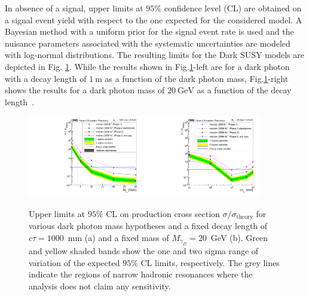 In absence of a signal, upper limits at $95\%$ confidence level (CL) are obtained on a signal
event yield with respect to the one expected for the considered model. A Bayesian method with a uniform prior for the signal event rate is used and the nuisance
parameters associated with the systematic uncertainties are modeled with log-normal distributions.
The resulting limits for the Dark SUSY models are depicted in Fig. \ref{fig:NewCompLimit_DarkPhoton}. While the results shown in Fig.\ref{fig:NewCompLimit_DarkPhoton}-left are for a dark photon with a decay length of $1~\mathrm{m}$ as a function of the dark photon mass, Fig.\ref{fig:NewCompLimit_DarkPhoton}-right shows the results for a dark photon mass of $20~\mathrm{GeV}$ as a function of the decay length~\cite{CMS-PAS-FTR-18-002}.



\begin{figure}[hbtp]
\begin{center}
\includegraphics[width=0.45\textwidth]{tex/figures/cmsupgrade/FTR-18-002/LimitComp_Ratio_DarkPhotons.pdf}
\includegraphics[width=0.45\textwidth]{tex/figures/cmsupgrade/FTR-18-002/LimitComp_Ratio_asfuncofCtau_DarkPhotons.pdf}
 \caption{Upper limits at $95\%$ CL on production cross section $\sigma / \sigma_{\text{theory}}$ for various dark photon mass hypotheses and a fixed decay length of $c\tau = 1000$~mm (a) and a fixed mass of $M_{\gamma_D} = 20$~GeV (b). Green and yellow shaded bands show the one and two sigma range of variation of the expected $95\%$ CL limits, respectively. The grey lines indicate the regions of narrow hadronic resonances where the analysis does not claim any sensitivity.}
\label{fig:NewCompLimit_DarkPhoton}
\end{center}
\end{figure}


